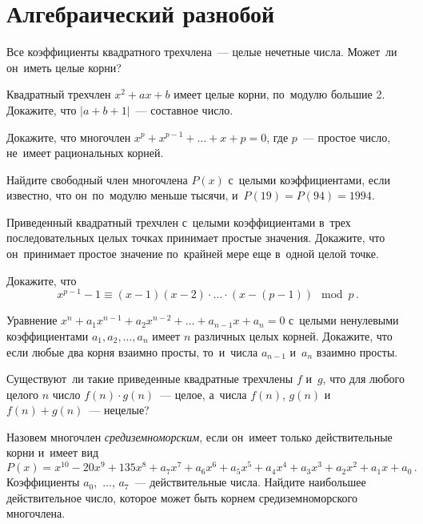 
\section*{Алгебраический разнобой}


\begingroup
    \def\abs#1{\lvert #1 \rvert}

\begin{problems}

\item
Все коэффициенты квадратного трехчлена~--- целые нечетные числа.
Может~ли он~иметь целые корни?

\item
Квадратный трехчлен $x^2 + a x + b$ имеет целые корни, по~модулю большие 2.
Докажите, что $\abs{a + b + 1}$~--- составное число.

\item
Докажите, что многочлен $x^p + x^{p-1} + \ldots + x + p = 0$, где $p$~---
простое число, не~имеет рациональных корней.

\item
Найдите свободный член многочлена $P(x)$ с~целыми коэффициентами, если
известно, что он~по~модулю меньше тысячи, и~$P(19) = P(94) = 1994$.

\item
Приведенный квадратный трехчлен с~целыми коэффициентами в~трех последовательных
целых точках принимает простые значения.
Докажите, что он~принимает простое значение по~крайней мере еще в~одной целой
точке.

\item
Докажите, что
\[
    x^{p-1} - 1
\equiv
    (x - 1) (x - 2) \cdot \ldots \cdot (x - (p-1))
\mod p
\, . \]

\item
Уравнение $x^n + a_1 x^{n-1} + a_2 x^{n-2} + \ldots + a_{n-1} x + a_n = 0$
с~целыми ненулевыми коэффициентами $a_1, a_2, \ldots, a_n$ имеет $n$ различных
целых корней.
Докажите, что если любые два корня взаимно просты, то~и~числа $a_{n-1}$ и~$a_n$
взаимно просты.

\item
Существуют~ли такие приведенные квадратные трехчлены $f$ и~$g$, что для любого
целого $n$ число $f(n) \cdot g(n)$~--- целое, а~числа $f(n)$, $g(n)$
и~$f(n) + g(n)$~--- нецелые?

\item
Назовем многочлен \emph{средиземноморским}, если он~имеет только действительные
корни и~имеет вид
\[
    P(x)
=
    x^{10} - 20 x^9 + 135 x^8 +
    a_7 x^7 + a_6 x^6 + a_5 x^5 + a_4 x^4 + a_3 x^3 + a_2 x^2 + a_1 x + a_0
\, . \]
Коэффициенты $a_0$,~$\ldots$, $a_7$~--- действительные числа.
Найдите наибольшее действительное число, которое может быть корнем
средиземноморского многочлена.

\end{problems}

\endgroup %

